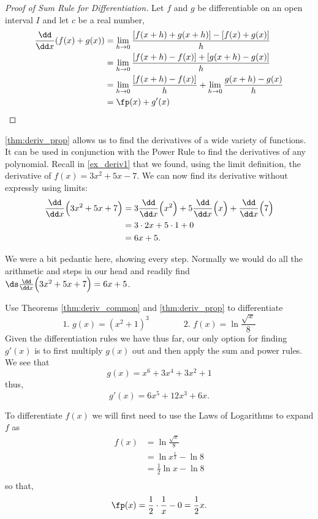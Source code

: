 \begin{proof}[Proof of Sum Rule for Differentiation]
Let $f$ and $g$ be differentiable on an open interval $I$ and let $c$ be a real number,
\begin{align*}
\frac{\dd}{\dd x}( f(x) + g(x))
&= \lim_{h\to 0} \frac{[f(x+h)+g(x+h)] - [f(x)+g(x)]}{h} \\
&= \lim_{h\to 0} \frac{[f(x+h)-f(x)] + [g(x+h) - g(x)]}{h} \\
&= \lim_{h\to 0} \frac{[f(x+h)-f(x)]}{h} + \lim_{h\to 0}\frac {g(x+h) - g(x)}{h}\\
&= \fp(x) + g'(x)\qedhere
\end{align*}
\end{proof}


\autoref{thm:deriv_prop} allows us to find the derivatives of a wide variety of functions. It can be used in conjunction with the Power Rule to find the derivatives of any polynomial. Recall in \autoref{ex_deriv1} that we found, using the limit definition, the derivative of $f(x) = 3x^2+5x-7$. We can now find its derivative without expressly using limits:
\begin{align*}
	\frac{\dd}{\dd x}\Bigl(3x^2+5x+7\Bigr)
	&= 3\frac{\dd}{\dd x}\Bigl(x^2\Bigr) + 5\frac{\dd}{\dd x}\Bigl(x\Bigr) + \frac{\dd}{\dd x}\Bigl(7\Bigr) \\
	&= 3\cdot 2x+5\cdot 1+ 0\\
	&= 6x+5.
\end{align*}

We were a bit pedantic here, showing every step. Normally we would do all the arithmetic and steps in our head and readily find $\ds \frac{\dd}{\dd x}\Bigl(3x^2+5x+7\Bigr) = 6x+5$.

\begin{example}\label{ex_der15}%
Use Theorems \ref{thm:deriv_common} and \ref{thm:deriv_prop} to differentiate
\[\text{1. }g(x)=(x^2+1)^3\qquad\qquad\text{2. }f(x)=\ln\frac{\sqrt{x}}8\]
\solution
Given the differentiation rules we have thus far, our only option for finding $g'(x)$ is to first multiply $g(x)$ out and then apply the sum and power rules. We see that
\[g(x) = x^6 + 3x^4 + 3x^2 + 1\]
thus,\vspace{-.5\baselineskip}
\[g'(x) = 6x^5 + 12x^3 + 6x.\]

To differentiate $f(x)$ we will first need to use the Laws of Logarithms to expand $f$ as\vspace{-.5\baselineskip}
\begin{align*}
f(x)
&= \ln \frac{\sqrt x}{8}\\
&= \ln x^{\frac{1}{2}} - \ln 8 \\
&= \frac12\ln x - \ln 8 \\
\end{align*}
so that,\vspace{-.5\baselineskip}
\[\fp(x)=\frac12\cdot\frac1x-0=\frac12x.\]
\end{example}

